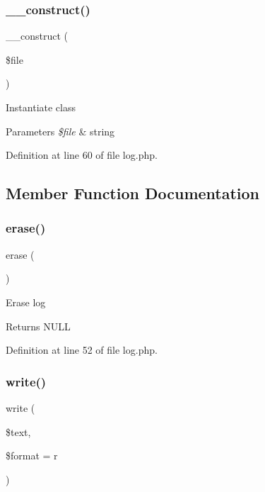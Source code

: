 \subsubsection{\texorpdfstring{\+\_\+\+\_\+construct()}{\_\_construct()}}
{\footnotesize\ttfamily \+\_\+\+\_\+construct (\begin{DoxyParamCaption}\item[{}]{\$file }\end{DoxyParamCaption})}

Instantiate class 
\begin{DoxyParams}{Parameters}
{\em \$file} & string \\
\hline
\end{DoxyParams}


Definition at line 60 of file log.\+php.



\subsection{Member Function Documentation}
\hypertarget{class_log_a933f3fa1037c8b797bdd237d811edf82}{}\label{class_log_a933f3fa1037c8b797bdd237d811edf82} 
\subsubsection{\texorpdfstring{erase()}{erase()}}
{\footnotesize\ttfamily erase (\begin{DoxyParamCaption}{ }\end{DoxyParamCaption})}

Erase log \begin{DoxyReturn}{Returns}
N\+U\+LL 
\end{DoxyReturn}


Definition at line 52 of file log.\+php.

\hypertarget{class_log_a41c34766cae727baba674b38abfdcf9c}{}\label{class_log_a41c34766cae727baba674b38abfdcf9c} 
\subsubsection{\texorpdfstring{write()}{write()}}
{\footnotesize\ttfamily write (\begin{DoxyParamCaption}\item[{}]{\$text,  }\item[{}]{\$format = {\ttfamily \textquotesingle{}r\textquotesingle{}} }\end{DoxyParamCaption})}

